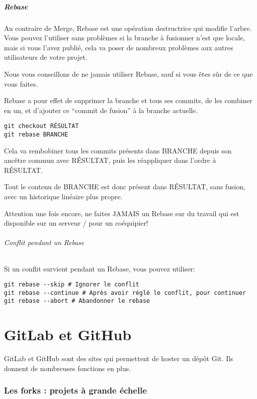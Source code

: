\documentclass[10pt,a4paper]{article}
\begin{document}
\subsubsection{Rebase}

Au contraire de Merge, Rebase est une opération destructrice qui modifie l'arbre. Vous pouvez l'utiliser sans problèmes si la branche à fusionner n'est que locale, mais si vous l'avez publié, cela va poser de nombreux problèmes aux autres utilisateurs de votre projet.

Nous vous conseillons de ne jamais utiliser Rebase, sauf si vous êtes sûr de ce que vous faites.

Rebase a pour effet de supprimer la branche et tous ses commits, de les combiner en un, et d'ajouter ce ``commit de fusion'' à la branche actuelle.

\begin{verbatim}
git checkout RÉSULTAT
git rebase BRANCHE
\end{verbatim}

Cela va rembobiner tous les commits présents dans BRANCHE depuis son ancêtre commun avec RÉSULTAT, puis les réappliquer dans l'ordre à RÉSULTAT.

Tout le contenu de BRANCHE est donc présent dans RÉSULTAT, sans fusion, avec un historique linéaire plus propre.

Attention une fois encore, ne faites JAMAIS un Rebase sur du travail qui est disponible sur un serveur / pour un coéquipier!

\paragraph{Conflit pendant un Rebase}
Si un conflit survient pendant un Rebase, vous pouvez utiliser:

\begin{verbatim}
git rebase --skip # Ignorer le conflit
git rebase --continue # Après avoir réglé le conflit, pour continuer
git rebase --abort # Abandonner le rebase
\end{verbatim}

\part{GitLab et GitHub}

GitLab et GitHub sont des sites qui permettent de hoster un dépôt Git. Ils donnent de nombreuses fonctions en plus.

\section{Les forks : projets à grande échelle}
\end{document}
